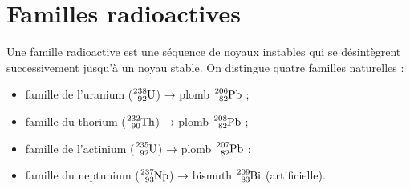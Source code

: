 \section{Familles radioactives}

Une famille radioactive est une séquence de noyaux instables qui se désintègrent successivement jusqu'à un noyau stable. On distingue quatre familles naturelles :
\begin{itemize}
    \item famille de l'uranium ($\ce{^{238}_{92}U}$) → plomb $\ce{^{206}_{82}Pb}$ ;
    \item famille du thorium ($\ce{^{232}_{90}Th}$) → plomb $\ce{^{208}_{82}Pb}$ ;
    \item famille de l'actinium ($\ce{^{235}_{92}U}$) → plomb $\ce{^{207}_{82}Pb}$ ;
    \item famille du neptunium ($\ce{^{237}_{93}Np}$) → bismuth $\ce{^{209}_{83}Bi}$ (artificielle).
\end{itemize}

